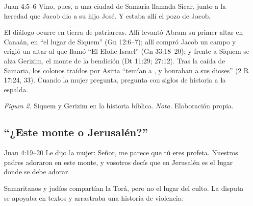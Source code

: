 \begin{verso}{Juan 4:5–6}
Vino, pues, a una ciudad de Samaria llamada Sicar, junto a la heredad que Jacob dio a su hijo José. Y estaba allí el pozo de Jacob.
\end{verso}

El diálogo ocurre en tierra de patriarcas. Allí levantó Abram su primer altar en Canaán, en ``el lugar de Siquem'' (Gn 12:6--7); allí compró Jacob un campo y erigió un altar al que llamó ``El-Elohe-Israel'' (Gn 33:18--20); y frente a Siquem se alza Gerizim, el monte de la bendición (Dt 11:29; 27:12). Tras la caída de Samaria, los colonos traídos por Asiria ``temían a \SENOR, y honraban a sus dioses'' (2 R 17:24, 33). Cuando la mujer pregunta, pregunta con siglos de historia a la espalda.

\begin{center}
\par
{\footnotesize\color{gris}\textit{Figura 2.} Siquem y Gerizim en la historia bíblica. \textit{Nota.} Elaboración propia.}
\end{center}

\subsection{“¿Este monte o Jerusalén?”}

\begin{verso}{Juan 4:19–20}
Le dijo la mujer: Señor, me parece que tú eres profeta. Nuestros padres adoraron en este monte, y vosotros decís que en Jerusalén es el lugar donde se debe adorar.
\end{verso}

Samaritanos y judíos compartían la Torá, pero no el lugar del culto. La disputa se apoyaba en textos y arrastraba una historia de violencia:

